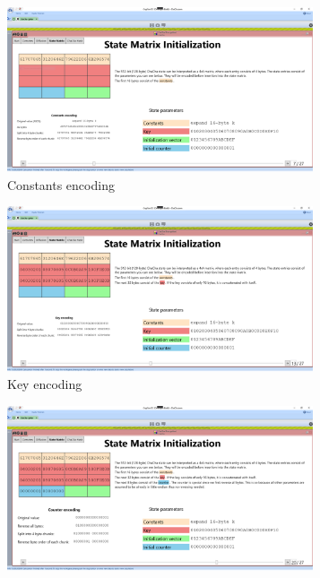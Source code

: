 \begin{figure}
\caption{Encoding of the state parameters on the State Matrix Initialization page}
\label{fig:statematrix.encoding}
\begin{subfigure}{0.5\textwidth}
  \centering
  \includegraphics[width=0.99\textwidth]{figures/ct2/state-matrix/1-state-matrix-constants.png}
  \caption{Constants encoding}
  \label{fig:statematrix.encoding.constants}
\end{subfigure}%
\begin{subfigure}{0.5\textwidth}
  \centering
  \includegraphics[width=0.99\textwidth]{figures/ct2/state-matrix/2-state-matrix-key.png}
  \caption{Key encoding}
  \label{fig:statematrix.encoding.key}
\end{subfigure}
\begin{subfigure}{0.5\textwidth}
  \centering
  \includegraphics[width=0.99\textwidth]{figures/ct2/state-matrix/3-state-matrix-counter.png}

\end{subfigure}
\end{figure}
